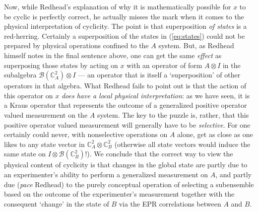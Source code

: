 \documentclass[12pt]{article}
\newcommand{\alg}[1]{\mbox{$\mathcal{#1}$}}
\begin{document}
 Now, while Redhead's explanation of why it is mathematically possible 
 for $x$ to be cyclic is perfectly correct, he actually misses the 
 mark when it comes to the physical interpretation of cyclicity.  The 
 point is
 that superposition \emph{of states} is a 
 red-herring.  Certainly a superposition 
 of the states in (\ref{eq:states}) could not be prepared by physical operations confined to the $A$ 
 system.  But, as Redhead himself notes in the final 
 sentence above, one can get the same \emph{effect} as superposing those 
 states by acting on $x$ with an operator of form $A\otimes I$ in the subalgebra 
 $\alg{B}({\mathbb{C}}_{A}^{2})\otimes I$ --- an operator that is itself a `superposition' of other operators 
 in that algebra.  
 What Redhead fails to point out
  is that the action of this operator on $x$ \emph{does have a 
  local physical
 interpretation}: as we have seen, it is a Kraus operator that represents the outcome of a generalized 
 positive operator valued measurement on the $A$ system.  The key to 
 the puzzle is, rather, that this positive operator valued measurement will generally have 
 to be 
 \emph{selective}.  For one certainly could never, with nonselective 
 operations on $A$ alone, get as close as one likes to any state vector in 
 $\mathbb{C}_{A}^{2}\otimes\mathbb{C}_{B}^{2}$ (otherwise all state 
 vectors would induce the same state on 
 $I\otimes\alg{B}({\mathbb{C}}_{B}^{2})$!). We conclude that the 
 correct way to 
 view the physical content of cyclicity is that changes in the global 
 state are partly due to an experimenter's ability to perform a generalized measurement on 
 $A$, and partly due (\emph{pace} Redhead) to the purely 
 conceptual operation of selecting a subensemble based on the outcome 
 of the experimenter's measurement together with the consequent `change' in the state 
 of $B$ via the EPR correlations between $A$ and $B$.
 
\end{document}
